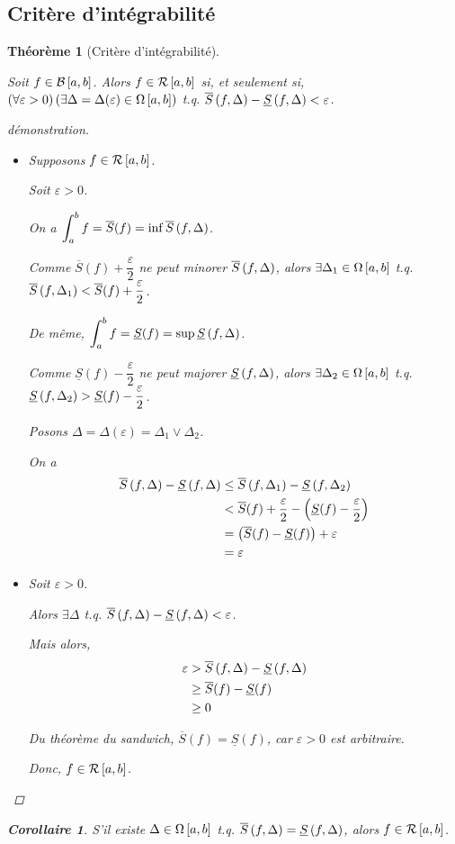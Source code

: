 \documentclass{report}
\newcommand*{\Ssup}[1]{\overline{S}(#1)}
\newcommand*{\Sinf}[1]{\underline{S}(#1)}
\newcommand*{\raffinement}[2]{#1 \vee #2}
\newcommand*{\eps}{\varepsilon}
\newtheorem*{thm}{Th\'eor\`eme}
\newtheorem*{coro}{Corollaire}
\theoremstyle{definition}
\theoremstyle{remark}
\begin{document}
	\subsection{Crit\`ere d'int\'egrabilit\'e}
	\begin{thm}[Crit\`ere d'int\'egrabilit\'e]
		~

		Soit $f \in \bornee$. Alors $f \in \riemann$ si, et seulement si, $\left( \forall \eps >0 \right) \left( \exists\Delta = \Delta(\eps) \in \partitions \right)$ t.q. $\ssup{f}-\sinf{f} < \eps$.
		\begin{proof}[d\'emonstration]~

			\begin{itemize}
				\item[$(\Rightarrow)$] Supposons $f \in \riemann$.

				Soit $\eps>0$.

				On a $\displaystyle\int_{a}^{b}f=\Ssup{f}=\inf\ssup{f}$.

				Comme $\Ssup{f}+\dfrac{\eps}{2}$ ne peut minorer $\ssup{f}$, alors $\exists\Delta_1 \in \partitions$ t.q. $\ssup{f}[\Delta_1] < \Ssup{f}+\dfrac{\eps}{2}$.

				De m\^eme, $\displaystyle\int_{a}^{b}f=\Sinf{f}=\sup\sinf{f}$.

				Comme $\Sinf{f}-\dfrac{\eps}{2}$ ne peut majorer $\sinf{f}$, alors $\exists\Delta_2 \in \partitions$ t.q. $\sinf{f}[\Delta_2] > \Sinf{f}-\dfrac{\eps}{2}$.

				Posons $\Delta = \Delta(\eps) = \raffinement{\Delta_1}{\Delta_2}$.

				On a
				\begin{align*}
					\ssup{f} - \sinf{f}&\leq \ssup{f}[\Delta_1] - \sinf{f}[\Delta_2]\\
					&< \Ssup{f} + \dfrac{\eps}{2} - \left( \Sinf{f} - \dfrac{\eps}{2} \right)\\
					&= \left( \Ssup{f} - \Sinf{f} \right) + \eps\\
					&= \eps
				\end{align*}
				\newpage
				\item[$(\Leftarrow)$] Soit $\eps>0$.

				Alors $\exists\Delta$ t.q. $\ssup{f}-\sinf{f}<\eps$.

				Mais alors,
				\begin{align*}
					\eps&> \ssup{f}-\sinf{f}\\
					&\geq \Ssup{f}-\Sinf{f}\\
					&\geq 0
				\end{align*}

				Du th\'eor\`eme du sandwich, $\Ssup{f}=\Sinf{f}$, car $\eps>0$ est arbitraire.

				Donc, $f \in \riemann$.
			\end{itemize}
		\end{proof}
		\begin{coro}
			S'il existe $\Delta \in \partitions$ t.q. $\ssup{f}=\sinf{f}$, alors $f \in \riemann$.
		\end{coro}
	\end{thm}
\end{document}
